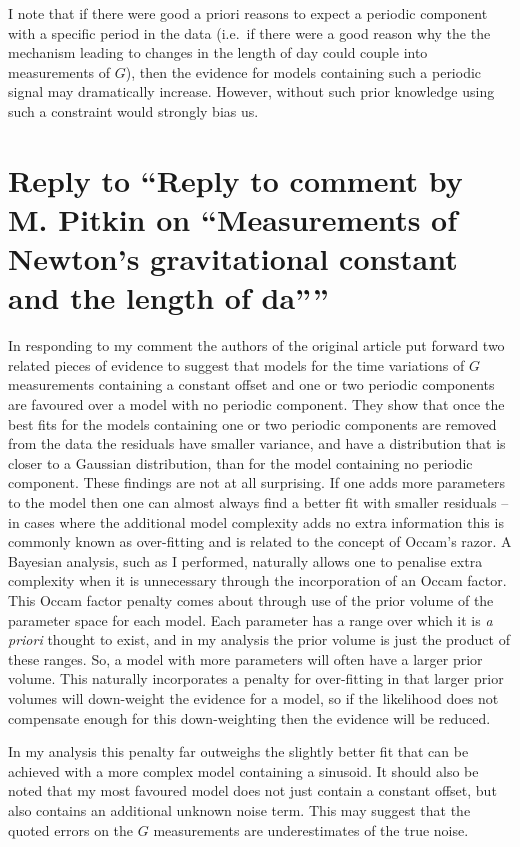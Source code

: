 \documentclass[doublecol]{epl2}
\begin{document}
I note that if there were good a priori reasons to expect a periodic component with a specific period in the data
(i.e.\ if there were a good reason why the the mechanism leading to changes in the length of day could couple into 
measurements of
$G$), then the evidence for models containing such a periodic signal may dramatically increase. However, without such
prior knowledge using such a constraint would strongly bias us.

\section{Reply to ``Reply to comment by M. Pitkin on ``Measurements of Newton's 
gravitational constant and the length of da''''}

In responding to my comment the authors of the original article put forward two related pieces of 
evidence to suggest that models for the time variations of $G$ measurements containing a constant 
offset and one or two periodic components are favoured over a model with no periodic component. 
They show that once the best fits for the models containing one or two periodic components are 
removed from the data the residuals have smaller variance, and have a distribution that is closer 
to a Gaussian distribution, than for the model containing no periodic component. These findings are 
not at all surprising.  If one adds more parameters to the model then one can almost always find a 
better fit with smaller residuals -- in cases where the additional model complexity adds no extra 
information this is commonly known as over-fitting and is related to the concept of Occam's razor. 
A Bayesian analysis, such as I performed, naturally allows one to penalise extra complexity when it 
is unnecessary through the incorporation of an Occam factor. This Occam factor penalty comes 
about through use of the prior volume of the parameter space for each model. Each parameter has a 
range over which it is {\it a priori} thought to exist, and in my analysis the prior volume is 
just the product of these ranges. So, a model with more parameters will often have a larger prior 
volume. This naturally incorporates a penalty for over-fitting in that larger prior volumes will 
down-weight the evidence for a model, so if the likelihood does not compensate enough for this 
down-weighting then the evidence will be reduced.

In my analysis this penalty far outweighs the slightly better fit that can be achieved with a more 
complex model containing a sinusoid. It should also be noted that my most favoured model does not 
just contain a constant offset, but also contains an additional unknown noise term. This may 
suggest that the quoted errors on the $G$ measurements are underestimates of the true noise.
\end{document}
